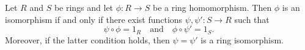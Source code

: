 Let $R$ and $S$ be rings and let $\phi: R \to S$ be a ring homomorphism. Then $\phi$ is an isomorphism if and only if there exist functions $\psi, \psi': S \to R$ such that
$$\psi \circ \phi = 1_R \quad \text{and} \quad \phi \circ \psi' = 1_S.$$
Moreover, if the latter condition holds, then $\psi = \psi'$ is a ring isomorphism.
